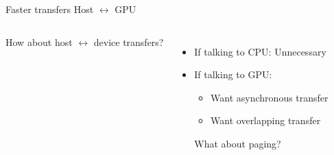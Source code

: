 \documentclass[english,compress]{beamer}
\begin{document}
{
  \newcommand{\brick}[6]{
    \draw [fill=#4!50]
      (0,0) rectangle (#1,#2) coordinate [pos=0.5] (brickfront);
    \draw [fill=#4]
      (#1,0) -- (#1,0,-1) -- (#1,#2,-1) -- (#1,#2) --cycle;
    \draw [fill=#4]
      (0,#2) -- (0,#2,-1) -- (#1,#2,-1) -- (#1,#2) --cycle;
    #6
    \begin{pgfonlayer}{foreground}
      \node [fill=#4!50,inner xsep=2pt,inner ysep=2pt,opacity=0.7,#5] at (brickfront) { #3 } ;
      \node [#5] at (brickfront) { #3 } ;
    \end{pgfonlayer}
  }
  \newcommand{\drawevt}[2]{
    \fill [#2,opacity=0.5]
      (0,#1) -- (1.5,#1) -- (1.5,#1,-1)
      -- (1.5,#1+0.2,-1) -- (1.5,#1+0.2) -- (0,#1+0.2) --  cycle ;
  }
  \begin{frame}{Faster transfers Host $\leftrightarrow$ GPU}
    \begin{columns}
        How about host $\leftrightarrow$ device transfers?
        \begin{itemize}
          \item If talking to CPU: Unnecessary
          \item If talking to GPU:

            \medskip
            \begin{itemize}
              \item Want asynchronous transfer
              \item Want overlapping transfer
            \end{itemize}

            \medskip
            What about paging?

        \end{itemize}

\end{columns}
\end{frame}}
\end{document}
